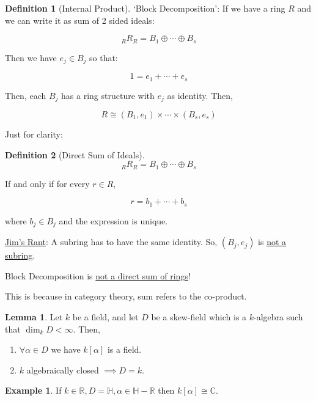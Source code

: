 \documentclass{article}
\theoremstyle{definition}
\newtheorem*{example}{Example}
\newtheorem*{definition}{Definition}
\newtheorem{lemma}[theorem]{Lemma}
\begin{document}
\begin{definition}
    [Internal Product]

    `Block Decomposition': If we have a ring \(R\) and we can write it as sum of 2 sided ideals:

    \[
        _R R _R = B_1 \oplus \cdots \oplus B_s
    \]

    Then we have \(e_j \in B_j\) so that:

    \[
        1 = e_1 + \cdots + e_s
    \]

    Then, each \(B_j\) has a ring structure with \(e_j\) as identity. Then,

    \[
        R \cong (B_1, e_1) \times \cdots \times (B_s, e_s)
    \]
\end{definition}

Just for clarity:

\begin{definition}
    [Direct Sum of Ideals]

    \[
        _R R _R = B_1 \oplus \cdots \oplus B_s
    \]

    If and only if for every \(r\in R\),

    \[
        r = b_1 + \cdots + b_s
    \]

    where \(b_j \in B_j\) and the expression is unique.
\end{definition}

\underline{Jim's Rant}: A subring has to have the same identity. So, \((B_j, e_j)\) is \underline{not a subring}. 

Block Decomposition is \underline{not a direct sum of rings}!

This is because in category theory, sum refers to the co-product. 

\begin{lemma}
    Let \(k\) be a field, and let \(D\) be a skew-field which is a \(k\)-algebra such that \(\dim_k D < \infty\). Then,

    \begin{enumerate}[label=\alph*)]
        \item \(\forall \alpha \in D\) we have \(k[\alpha]\) is a field.
        \item \(k\) algebraically closed \(\implies D = k\). 
    \end{enumerate} 
\end{lemma}

\begin{example}
    If \(k\in\mathbb{R}, D = \mathbb{H}, \alpha \in \mathbb{H} - \mathbb{R} \) then \(k[\alpha] \cong \mathbb{C}\). 
\end{example}
\end{document}

